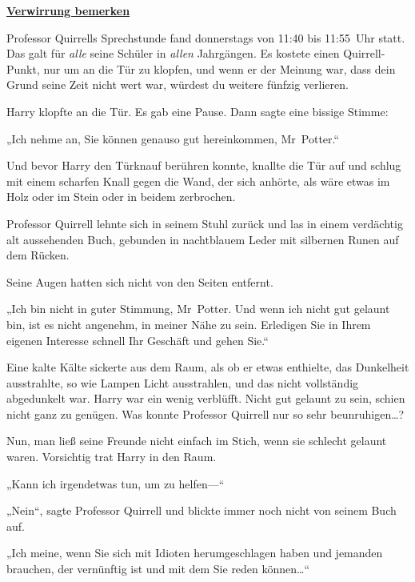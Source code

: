 

\hypertarget{verwirrung-bemerken}{%

\textbf{\uline{Verwirrung bemerken}}

Professor Quirrells Sprechstunde fand donnerstags von 11:40 bis 11:55~Uhr statt. Das galt für \emph{alle} seine Schüler in \emph{allen} Jahrgängen. Es kostete einen Quirrell-Punkt, nur um an die Tür zu klopfen, und wenn er der Meinung war, dass dein Grund seine Zeit nicht wert war, würdest du weitere fünfzig verlieren.

Harry klopfte an die Tür. Es gab eine Pause. Dann sagte eine bissige Stimme:

„Ich nehme an, Sie können genauso gut hereinkommen, Mr~Potter.“

Und bevor Harry den Türknauf berühren konnte, knallte die Tür auf und schlug mit einem scharfen Knall gegen die Wand, der sich anhörte, als wäre etwas im Holz oder im Stein oder in beidem zerbrochen.

Professor Quirrell lehnte sich in seinem Stuhl zurück und las in einem verdächtig alt aussehenden Buch, gebunden in nachtblauem Leder mit silbernen Runen auf dem Rücken.

Seine Augen hatten sich nicht von den Seiten entfernt.

„Ich bin nicht in guter Stimmung, Mr~Potter. Und wenn ich nicht gut gelaunt bin, ist es nicht angenehm, in meiner Nähe zu sein. Erledigen Sie in Ihrem eigenen Interesse schnell Ihr Geschäft und gehen Sie.“

Eine kalte Kälte sickerte aus dem Raum, als ob er etwas enthielte, das Dunkelheit ausstrahlte, so wie Lampen Licht ausstrahlen, und das nicht vollständig abgedunkelt war. Harry war ein wenig verblüfft. Nicht gut gelaunt zu sein, schien nicht ganz zu genügen. Was konnte Professor Quirrell nur so sehr beunruhigen…?

Nun, man ließ seine Freunde nicht einfach im Stich, wenn sie schlecht gelaunt waren. Vorsichtig trat Harry in den Raum.

„Kann ich irgendetwas tun, um zu helfen—“

„Nein“, sagte Professor Quirrell und blickte immer noch nicht von seinem Buch auf.

„Ich meine, wenn Sie sich mit Idioten herumgeschlagen haben und jemanden brauchen, der vernünftig ist und mit dem Sie reden können…“

}
